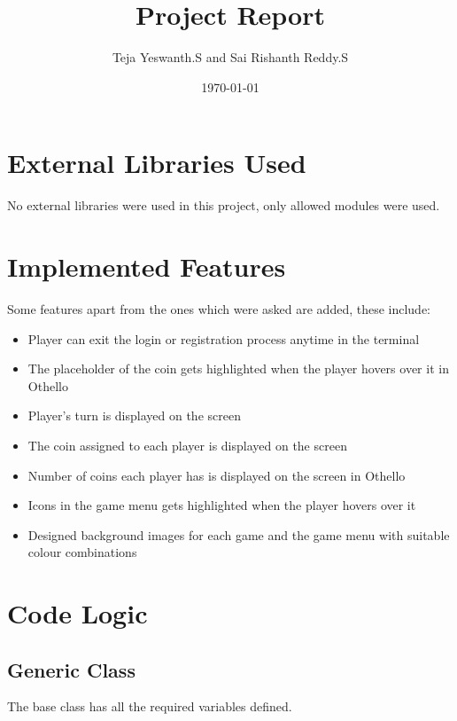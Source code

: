 \documentclass[12pt]{article}
\title{Project Report}
\author{Teja Yeswanth.S and Sai Rishanth Reddy.S}
\date{\today}
\begin{document}
\maketitle

\tableofcontents
\newpage

\section{External Libraries Used}
\label{sec:libraries}

No external libraries were used in this project, only allowed modules were used.


\section{Implemented Features}
\label{sec:features}

Some features apart from the ones which were asked are added, these include: 

\begin{itemize}
  \item Player can exit the login or registration process anytime in the terminal
  \item The placeholder of the coin gets highlighted when the player hovers over it in Othello
  \item Player's turn is displayed on the screen
  \item The coin assigned to each player is displayed on the screen
  \item Number of coins each player has is displayed on the screen in Othello
  \item Icons in the game menu gets highlighted when the player hovers over it
  \item Designed background images for each game and the game menu with suitable colour combinations
\end{itemize}

\newpage
\section{Code Logic}
\label{sec:logic}

\subsection{Generic Class}
\label{sec:generic}

The base class has all the required variables defined.
\end{document}
